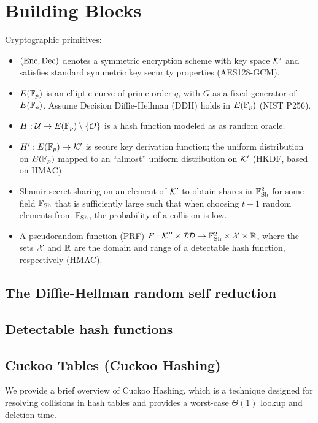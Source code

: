 

\section{Building Blocks} %
\label{sec:building_blocks}


Cryptographic primitives:
\begin{itemize}
	\item $\left(\text{Enc}, \text{Dec}\right)$ denotes  a symmetric encryption scheme with  key space $\mathcal{K}'$ and satisfies standard symmetric key security properties (AES128-GCM).
	\item $E(\mathbb{F}_p)$ is an elliptic curve of prime order $q$, with $G$ as a fixed generator of $E(\mathbb{F}_p)$. Assume Decision Diffie-Hellman (DDH) holds in $E(\mathbb{F}_p)$ (NIST P256).
	\item $H : \mathcal{U} \to E(\mathbb{F}_p) \setminus \left\{\mathcal{O}\right\}$ is a hash function modeled as as random oracle.
	\item $H' : E(\mathbb{F}_p) \to \mathcal{K}'$ is secure key derivation function; the uniform distribution on $E(\mathbb{F}_p) $ mapped to an ``almost'' uniform distribution on $\mathcal{K}'$ (HKDF, based on HMAC)
	\item Shamir secret sharing on an element of $\mathcal{K}'$ to obtain shares in $\mathbb{F}_{\text{Sh}}^2$ for some field $\mathbb{F}_{\text{Sh}}$ that is sufficiently large such that when choosing $t+1$ random elements from $\mathbb{F}_{\text{Sh}}$, the probability of a collision is low.

	\item A pseudorandom function (PRF) $F : \mathcal{K}'' \times \mathcal{ID} \to \mathbb{F}_{\text{Sh}}^2 \times \mathcal{X} \times \mathbb{R}$, where the sets $\mathcal{X}$ and $\mathbb{R}$ are the domain and range of a detectable hash function, respectively (HMAC).
\end{itemize}

\subsection{The Diffie-Hellman random self reduction} %
\label{sub:the_diffie_hellman_random_self_reduction}


\subsection{Detectable hash functions} %
\label{sub:detectable_hash_functions}



\subsection{Cuckoo Tables (Cuckoo Hashing)} %
\label{sub:cuckoo_tables}

We provide a brief overview of Cuckoo Hashing, which is a technique designed for resolving collisions in hash tables and provides a worst-case $\Theta(1)$ lookup and deletion time.